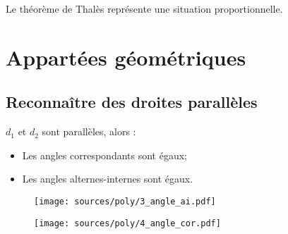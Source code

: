 \documentclass[paper=a4, fontsize=12pt]{scrartcl} %
\begin{document}
\begin{Proposition}{Le théorème de Thalès représente une situation proportionnelle.}
\end{Proposition}


\section{Appartées géométriques}

\subsection{Reconnaître des droites parallèles}

\begin{multicols}{3}

 \begin{Proposition}{$d_1$ et $d_2$ sont parallèles, alors :}\\
\begin{itemize}
    \item Les angles correspondants sont égaux;
    \item Les angles alternes-internes sont égaux.
\end{itemize}
  \end{Proposition}

\begin{figure}[H]
  \centering
  \texttt{[image: sources/poly/3\_angle\_ai.pdf]}
\end{figure}


\begin{figure}[H]
  \centering
  \texttt{[image: sources/poly/4\_angle\_cor.pdf]}
\end{figure}

\end{multicols}
\end{document}
